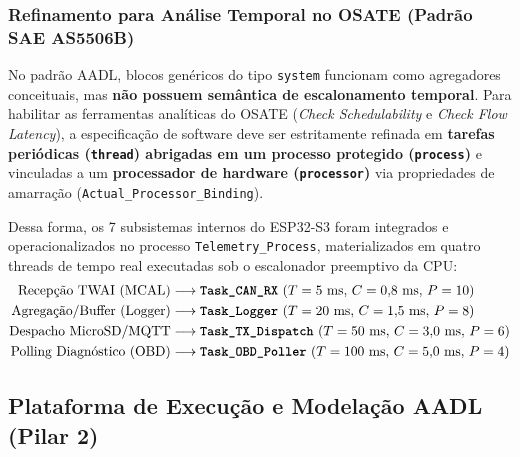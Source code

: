 \subsubsection{Refinamento para Análise Temporal no OSATE (Padrão SAE AS5506B)}
No padrão AADL, blocos genéricos do tipo \texttt{system} funcionam como agregadores conceituais, mas \textbf{não possuem semântica de escalonamento temporal}. Para habilitar as ferramentas analíticas do OSATE (\textit{Check Schedulability} e \textit{Check Flow Latency}), a especificação de software deve ser estritamente refinada em \textbf{tarefas periódicas (\texttt{thread}) abrigadas em um processo protegido (\texttt{process})} e vinculadas a um \textbf{processador de hardware (\texttt{processor})} via propriedades de amarração (\texttt{Actual\_Processor\_Binding}). 

Dessa forma, os 7 subsistemas internos do ESP32-S3 foram integrados e operacionalizados no processo \texttt{Telemetry\_Process}, materializados em quatro threads de tempo real executadas sob o escalonador preemptivo da CPU:
\begin{align*}
\text{Recepção TWAI (MCAL)} &\longrightarrow \textbf{\texttt{Task\_CAN\_RX}}\ (T = 5\text{ ms},\, C = 0{,}8\text{ ms},\, P = 10) \\
\text{Agregação/Buffer (Logger)} &\longrightarrow \textbf{\texttt{Task\_Logger}}\ (T = 20\text{ ms},\, C = 1{,}5\text{ ms},\, P = 8) \\
\text{Despacho MicroSD/MQTT} &\longrightarrow \textbf{\texttt{Task\_TX\_Dispatch}}\ (T = 50\text{ ms},\, C = 3{,}0\text{ ms},\, P = 6) \\
\text{Polling Diagnóstico (OBD)} &\longrightarrow \textbf{\texttt{Task\_OBD\_Poller}}\ (T = 100\text{ ms},\, C = 5{,}0\text{ ms},\, P = 4)
\end{align*}

\subsection{Plataforma de Execução e Modelação AADL (Pilar 2)}
\label{subsec:pilar2_detalhe}

